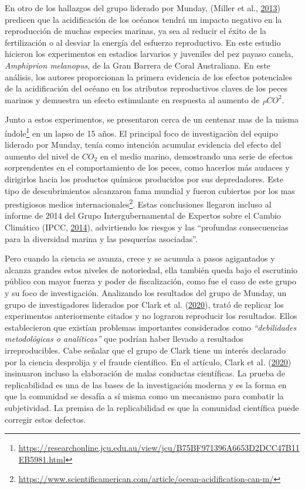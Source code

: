 \documentclass[
]{article}
\begin{document}
En otro de los hallazgos del grupo liderado por Munday, (Miller et al.,
\protect\hyperlink{ref-Miller2013}{2013}) predicen que la acidificación
de los océanos tendrá un impacto negativo en la reproducción de muchas
especies marinas, ya sea al reducir el éxito de la fertilización o al
desviar la energía del esfuerzo reproductivo. En este estudio hicieron
los experimentos en estadios larvarios y juveniles del pez payaso
canela, \emph{Amphiprion melanopus}, de la Gran Barrera de Coral
Australiana. En este análisis, los autores proporcionan la primera
evidencia de los efectos potenciales de la acidificación del océano en
los atributos reproductivos claves de los peces marinos y demuestra un
efecto estimulante en respuesta al aumento de \(_PCO^2\).

Junto a estos experimentos, se presentaron cerca de un centenar mas de
la misma índole\footnote{\url{https://researchonline.jcu.edu.au/view/jcu/B75BF971396A6653D2DCC47B11EB5981.html}}
en un lapso de 15 años. El principal foco de investigaciòn del equipo
liderado por Munday, tenía como intención acumular evidencia del efecto
del aumento del nivel de \({CO}_{2}\) en el medio marino, demostrando
una serie de efectos sorprendentes en el comportamiento de los peces,
como hacerlos más audaces y dirigirlos hacia los productos químicos
producidos por sus depredadores. Este tipo de descubrimientos alcanzaron
fama mundial y fueron cubiertos por los mas prestigiosos medios
internacionales\footnote{\url{https://www.scientificamerican.com/article/ocean-acidification-can-m/}}.
Estas conclusiones llegaron incluso al informe de 2014 del Grupo
Intergubernamental de Expertos sobre el Cambio Climático (IPCC,
\protect\hyperlink{ref-IPCC2014}{2014}), advirtiendo los riesgos y las
``profundas consecuencias para la diversidad marina y las pesquerías
asociadas''.

Pero cuando la ciencia se avanza, crece y se acumula a pasos agigantados
y alcanza grandes estos niveles de notoriedad, ella también queda bajo
el escrutinio público con mayor fuerza y poder de fiscalización, como
fue el caso de este grupo y su foco de investigación. Analizando los
resultados del grupo de Munday, un grupo de investigadores liderados por
Clark et al. (\protect\hyperlink{ref-Clark2020}{2020}), trató de
replicar los experimentos anteriormente citados y no lograron reproducir
los resultados. Ellos establecieron que existían problemas importantes
considerados como \emph{``debilidades metodológicas o analíticas''} que
podrían haber llevado a resultados irreproducibles. Cabe señalar que el
grupo de Clark tiene un interés declarado por la ciencia desprolija y el
fraude científico. En el artículo, Clark et al.
(\protect\hyperlink{ref-Clark2020}{2020}) insinuaron incluso la
elaboración de malas conductas científicas. La prueba de replicabilidad
es una de las bases de la investigación moderna y es la forma en que la
comunidad se desafía a sí misma como un mecanismo para combatir la
subjetividad. La premisa de la replicabilidad es que la comunidad
científica puede corregir estos defectos.
\end{document}
